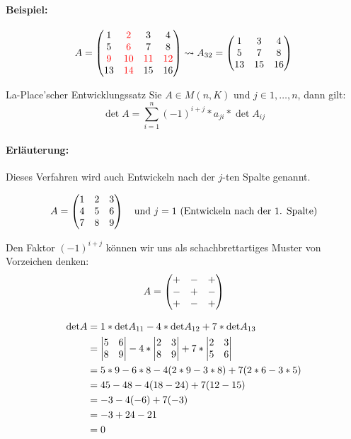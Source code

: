 \paragraph{Beispiel:}
\begin{equation*}
	A=\matrix{1&\color{red}2&3&4\\5&\color{red}6&7&8\\\color{red}9&\color{red}10&\color{red}11&\color{red}12\\13&\color{red}14&15&16}
	\rightsquigarrow A_{32}=\matrix{1&3&4\\5&7&8\\13&15&16}
\end{equation*}

\begin{satz}{La-Place'scher Entwicklungssatz}
	Sie $A\in M(n,K)$ und $j\in{1,\ldots, n}$, dann gilt:
	\begin{equation*}
		\det A=\sum\limits_{i=1}^n(-1)^{i+j}*a_{ji}*\det{A_{ij}}
	\end{equation*}
\end{satz}
\paragraph{Erläuterung:}
Dieses Verfahren wird auch Entwickeln nach der $j$-ten Spalte genannt.

\begin{equation*}
	A=\matrix{1&2&3\\4&5&6\\7&8&9}\quad\text{und }j=1 \text{ (Entwickeln nach der 1. Spalte)}
\end{equation*}

Den Faktor $(-1)^{i+j}$ können wir uns als schachbrettartiges Muster von Vorzeichen denken:
\begin{equation*}
	A=\matrix{+&-&+\\-&+&-\\+&-&+}
\end{equation*}

\begin{align*}
	\det A 	&= 1*\det A_{11}-4*\det A_{12}+7*\det A_{13}\\
					&= \detmatrix{5&6\\8&9}-4*\detmatrix{2&3\\8&9}+7*\detmatrix{2&3\\5&6}\\
					&= 5*9-6*8-4(2*9-3*8)+7(2*6-3*5)\\
					&= 45-48-4(18-24)+7(12-15)\\
					&= -3-4(-6)+7(-3)\\
					&= -3+24-21\\
					&= 0
\end{align*}

